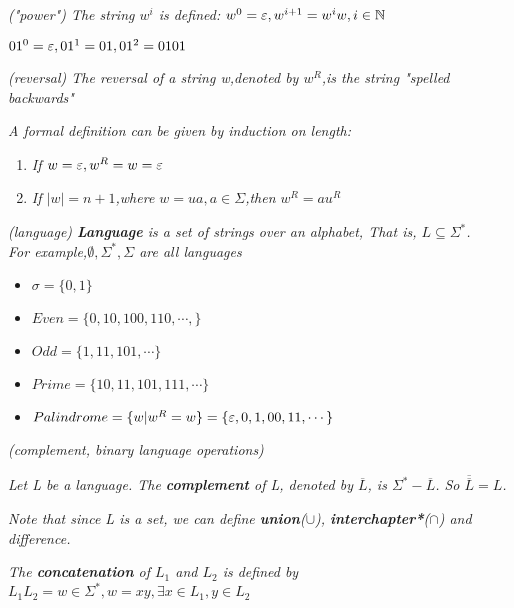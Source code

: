 \documentclass{article}
\begin{document}
\begin{defn}
    \textit{("power") The string $w^i$ is defined: $w^0 = \varepsilon,w^{i+1}=w^iw,i \in \mathbb{N}$}
\end{defn}
\begin{example}
    $01^0 = \varepsilon, 01^1 = 01, 01^2 = 0101$
\end{example}
\begin{defn}
    \textit{(reversal) The reversal of a string w,denoted by $w^R$,is the string "spelled backwards"}

    \textit{A formal definition can be given by induction on length:}

    \begin{enumerate}
        \item \textit{If $w = \varepsilon,w^R = w = \varepsilon$}
        \item \textit{If $|w| = n+1$,where $w = ua,a\in \Sigma$,then $w^R = au^R$}
    \end{enumerate}
\end{defn}

\begin{defn}
    \textit{(language) \textbf{Language} is a set of strings over an alphabet, That is, $L\subseteq \Sigma^*$.\\ \indent For example,$\emptyset,\Sigma^*,\Sigma$ are all languages}
    \begin{itemize}
        \item $\sigma = \{0,1\}$
        \item $Even = \{0,10,100,110,\cdots,\}$
        \item $Odd = \{1,11,101,\cdots\}$
        \item $Prime = \{10,11,101,111,\cdots\}$
        \item $Palindrome = \{w|w^R=w\}=\{\varepsilon,0,1,00,11,\cdots\}$
    \end{itemize}
\end{defn}

\begin{defn}
    \textit{(complement, binary language operations)}

    \textit{Let L be a language. The \textbf{complement} of L, denoted by $\overline{L}$, is $\Sigma^*-\overline{L}$. So $\overline {\overline{L}}= L$.}

    \textit{Note that since L is a set, we can define \textbf{union}($\cup$), \textbf{interchapter*}($\cap$) and difference.}

    \textit{The \textbf{concatenation} of $L_1$ and $L_2$ is defined by $L_1L_2 = {w \in \Sigma^*, w = xy, \exists x \in L_1, y \in L_2}$}
\end{defn}
\end{document}
